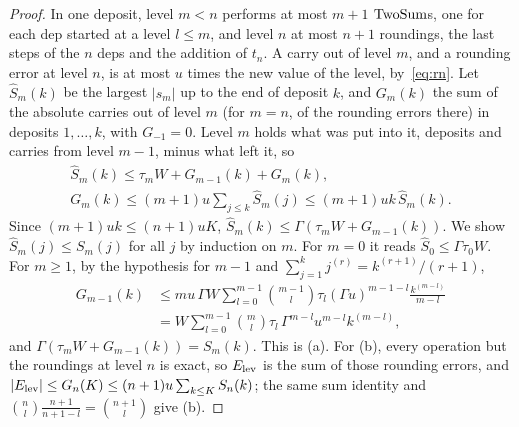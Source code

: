 \begin{proof}
In one deposit, level $m < n$ performs at most $m+1$ $\mathrm{TwoSum}$s, one for each dep started at a level $l \le m$, and
level $n$ at most $n+1$ roundings, the last steps of the $n$ deps and the addition of $t_n$. A carry out of level $m$,
and a rounding error at level $n$, is at most $u$ times the new value of the level, by~\eqref{eq:rn}. Let $\hat S_m(k)$
be the largest $|s_m|$ up to the end of deposit $k$, and $G_m(k)$ the sum of the absolute carries out of level $m$
(for $m = n$, of the rounding errors there) in deposits $1, \dots, k$, with $G_{-1} = 0$. Level $m$ holds what was put
into it, deposits and carries from level $m-1$, minus what left it, so
\begin{gather*}
\hat S_m(k) \le \tau_m W + G_{m-1}(k) + G_m(k), \\
G_m(k) \le (m+1)u\sum_{j \le k}\hat S_m(j) \le (m+1)uk\,\hat S_m(k).
\end{gather*}
Since $(m+1)uk \le (n+1)uK$, $\hat S_m(k) \le \Gamma(\tau_mW + G_{m-1}(k))$. We show $\hat S_m(j) \le S_m(j)$ for all
$j$ by induction on $m$. For $m = 0$ it reads $\hat S_0 \le \Gamma\tau_0W$. For $m \ge 1$, by the hypothesis for
$m - 1$ and $\sum_{j=1}^{k} j^{(r)} = k^{(r+1)}/(r+1)$,
\begin{align*}
G_{m-1}(k) &\le mu\,\Gamma W\sum_{l=0}^{m-1}\binom{m-1}{l}\tau_l(\Gamma u)^{m-1-l}\frac{k^{(m-l)}}{m-l} \\
&= W\sum_{l=0}^{m-1}\binom{m}{l}\tau_l\,\Gamma^{m-l}u^{m-l}k^{(m-l)},
\end{align*}
and $\Gamma(\tau_mW + G_{m-1}(k)) = S_m(k)$. This is (a). For (b), every operation but the roundings at level $n$ is
exact, so $E_{\rm lev}$ is the sum of those rounding errors, and $|E_{\rm lev}| \le G_n(K) \le (n+1)u\sum_{k \le K}
S_n(k)$; the same sum identity and $\binom{n}{l}\frac{n+1}{n+1-l} = \binom{n+1}{l}$ give (b).
\end{proof}

